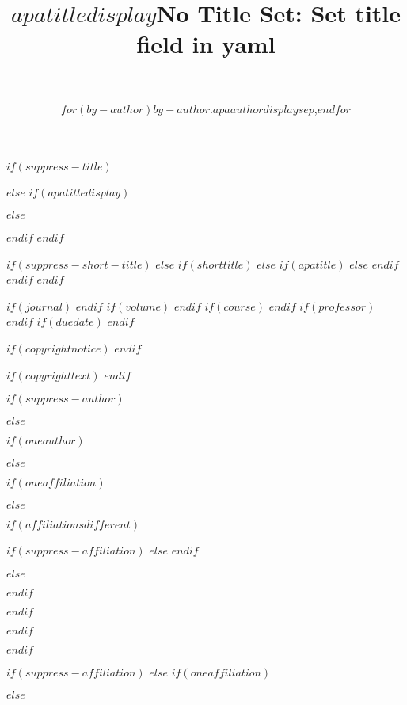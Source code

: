$if(suppress-title)$
\title{}
$else$
$if(apatitledisplay)$
\title{$apatitledisplay$}
$else$
\title{No Title Set: Set title field in yaml}
$endif$
$endif$


$if(suppress-short-title)$
\shorttitle{}
$else$
$if(shorttitle)$
$else$
$if(apatitle)$
$else$
$endif$
$endif$
$endif$


\usepackage{etoolbox}


$if(journal)$
$endif$
$if(volume)$
$endif$
$if(course)$
$endif$
$if(professor)$
$endif$
$if(duedate)$
$endif$

$if(copyrightnotice)$
$endif$

$if(copyrighttext)$
$endif$

$if(suppress-author)$
\author{~}
$else$

$if(oneauthor)$
\author{$for(by-author)$$by-author.apaauthordisplay$$sep$,$endfor$}
$else$

$if(oneaffiliation)$


$else$

$if(affiliationsdifferent)$

$if(suppress-affiliation)$
$else$
$endif$


$else$


$endif$

$endif$

$endif$

$endif$

$if(suppress-affiliation)$
\affiliation{}
$else$
$if(oneaffiliation)$


$else$

